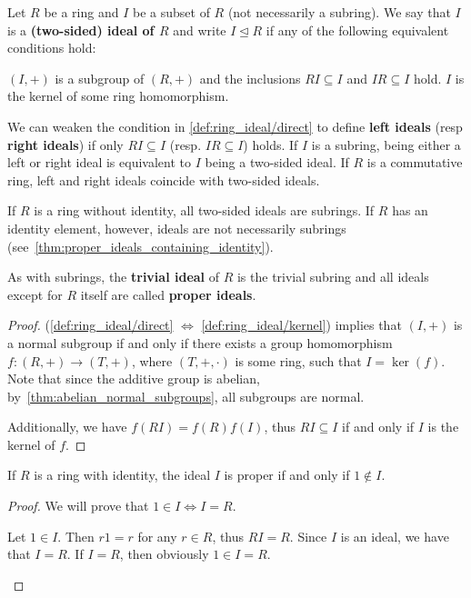 \begin{definition}\label{def:ring_ideal}
  Let \( R \) be a ring and \( I \) be a subset of \( R \) (not necessarily a subring). We say that \( I \) is a \textbf{(two-sided) ideal of \( R \)} and write \( I \unlhd R \) if any of the following equivalent conditions hold:
  \begin{defenum}
     \( (I, +) \) is a subgroup of \( (R, +) \) and the inclusions \( RI \subseteq I \) and \( IR \subseteq I \) hold.
     \( I \) is the kernel of some ring homomorphism.
  \end{defenum}

  We can weaken the condition in \ref{def:ring_ideal/direct} to define \textbf{left ideals} (resp \textbf{right ideals}) if only \( RI \subseteq I \) (resp. \( IR \subseteq I \)) holds. If \( I \) is a subring, being either a left or right ideal is equivalent to \( I \) being a two-sided ideal. If \( R \) is a commutative ring, left and right ideals coincide with two-sided ideals.

  If \( R \) is a ring without identity, all two-sided ideals are subrings. If \( R \) has an identity element, however, ideals are not necessarily subrings (see~\cref{thm:proper_ideals_containing_identity}).

  As with subrings, the \textbf{trivial ideal} of \( R \) is the trivial subring and all ideals except for \( R \) itself are called \textbf{proper ideals}.
\end{definition}
\begin{proof}
  (\ref{def:ring_ideal/direct} \( \iff \) \ref{def:ring_ideal/kernel})  implies that \( (I, +) \) is a normal subgroup if and only if there exists a group homomorphism \( f: (R, +) \to (T, +) \), where \( (T, +, \cdot) \) is some ring, such that \( I = \ker(f) \). Note that since the additive group is abelian, by~\cref{thm:abelian_normal_subgroups}, all subgroups are normal.

  Additionally, we have \( f(RI) = f(R)f(I) \), thus \( RI \subseteq I \) if and only if \( I \) is the kernel of \( f \).
\end{proof}

\begin{proposition}\label{thm:proper_ideals_containing_identity}
  If \( R \) is a ring with identity, the ideal \( I \) is proper if and only if \( 1 \not\in I \).
\end{proposition}
\begin{proof}
  We will prove that \( 1 \in I \iff I = R \).

  \begin{description}
    \Implies Let \( 1 \in I \). Then \( r1 = r \) for any \( r \in R \), thus \( RI = R \). Since \( I \) is an ideal, we have that \( I = R \).
    \ImpliedBy If \( I = R \), then obviously \( 1 \in I = R \).
  \end{description}
\end{proof}

